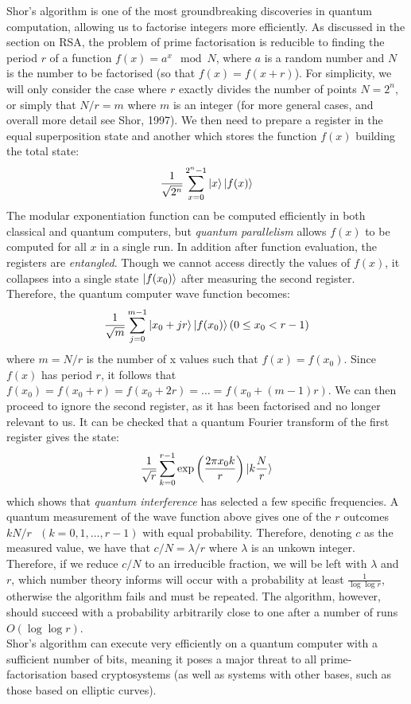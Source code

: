 \documentclass{article}
\begin{document}
   Shor's algorithm is one of the most groundbreaking discoveries
   in quantum computation, allowing us to factorise integers
   more efficiently. As discussed in the section on RSA, the problem
   of prime factorisation is reducible to finding the period $r$ of a 
   function $f(x) = a^x \mod{N}$, where $a$ is a random number and 
   $N$ is the number to be factorised (so that $f(x) = f(x+r)$). For
   simplicity, we will only consider the case where $r$ exactly divides
   the number of points $N = 2^n$, or simply that $N/r = m$ where $m$
   is an integer (for more general cases, and overall more detail see
   Shor, 1997).
   \medskip
   We then need to prepare a register in the equal superposition state
   and another which stores the function $f(x)$ building the total state:
   \[\frac{1}{\sqrt{2^n}}\sum_{x=0}^{2^n-1}\ket{x}\ket{f(x)}\]
   The modular exponentiation function can be computed efficiently in 
   both classical and quantum computers, but \textit{quantum parallelism}
   allows $f(x)$ to be computed for all $x$ in a single run. In addition
   after function evaluation, the registers are \textit{entangled}. Though
   we cannot access directly the values of $f(x)$, it collapses into a single
   state $\ket{f(x_0)}$ after measuring the second register. Therefore, the
   quantum computer wave function becomes:
   \[\frac{1}{\sqrt{m}}\sum_{j=0}^{m-1}\ket{x_0+jr}\ket{f(x_0)}   (0 \le x_0 < r-1)\]
   where $m = N/r$ is the number of x values such that $f(x) = f(x_0)$.
   Since $f(x)$ has period $r$, it follows that $f(x_0) = f(x_0 + r)
   = f(x_0 + 2r) = \ldots = f(x_0 + (m-1)r)$. We can then proceed to
   ignore the second register, as it has been factorised and no longer
   relevant to us. It can be checked that a quantum Fourier transform
   of the first register gives the state:
   \[\frac{1}{\sqrt{r}}\sum_{k=0}^{r-1}\exp\left(\frac{2\pi x_0 k}{r}\right)\ket{k\frac{N}{r}}\]
   which shows that \textit{quantum interference} has selected a few
   specific frequencies. A quantum measurement of the wave function
   above gives one of the $r$ outcomes $kN/r \text{     } (k = 0, 1, \ldots, r-1)$
   with equal probability. Therefore, denoting $c$ as the measured
   value, we have that $c/N = \lambda/r$ where $\lambda$ is an unkown
   integer. Therefore, if we reduce $c/N$ to an irreducible fraction,
   we will be left with $\lambda$ and $r$, which number theory informs
   will occur with a probability at least $\frac{1}{\log\log r}$,
   otherwise the algorithm fails and must be repeated. The algorithm,
   however, should succeed with a probability arbitrarily close to one
   after a number of runs $O(\log \log r)$.
   \medskip
   \\
   Shor's algorithm can execute very efficiently on a quantum computer
   with a sufficient number of bits, meaning it poses a major threat
   to all prime-factorisation based cryptosystems (as well as systems
   with other bases, such as those based on elliptic curves).
\end{document}
